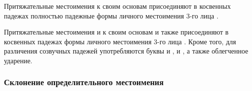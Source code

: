 \documentclass[11pt,a4paper,oneside]{memoir}
\begin{document}
    Притяжательные местоимения {} к своим основам {} присоединяют в косвенных падежах полностью падежные формы личного местоимения 3-го лица {}.
    
    Притяжательные местоимения {} и {} к своим основам {} и {} также присоединяют в косвенных падежах формы личного местоимения 3-го лица {}. Кроме того, для различения созвучных падежей употребляются буквы {} и {}, {} и {}, а также облегченное ударение.

                \subsubsection{Склонение определительного местоимения {}}
    
\end{document}
